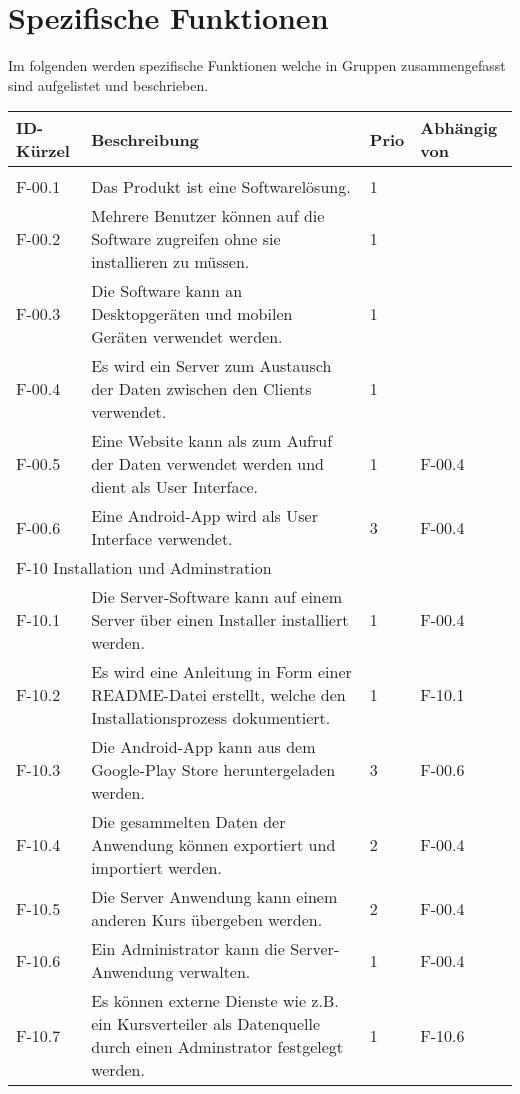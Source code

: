 \newpage
\section{Spezifische Funktionen}
Im folgenden werden spezifische Funktionen welche in Gruppen zusammengefasst sind aufgelistet und beschrieben.
\begin{tabularx}{\textwidth}{|l|X|l|l|}
    \toprule
    \textbf{ID-Kürzel} & \textbf{Beschreibung} & \textbf{Prio} & \textbf{Abhängig von} \\
    \midrule
    \endhead
    \hline
    \caption{Funktionen}
    \endfoot
    \multicolumn{4}{|l|}{F-00 Allgemein}\\
    \hline
    F-00.1 & Das Produkt ist eine Softwarelösung. & 1 & \\
    F-00.2 & Mehrere Benutzer können auf die Software zugreifen ohne sie installieren zu müssen. & 1 & \\
    F-00.3 & Die Software kann an Desktopgeräten und mobilen Geräten verwendet werden. & 1 & \\
    F-00.4 & Es wird ein Server zum Austausch der Daten zwischen den Clients verwendet. & 1 & \\
    F-00.5 & Eine Website kann als zum Aufruf der Daten verwendet werden und dient als User Interface. & 1 & F-00.4\\
    F-00.6 & Eine Android-App wird als User Interface verwendet. & 3 & F-00.4\\
    \hline
    \multicolumn{4}{|l|}{F-10 Installation und Adminstration}\\
    \hline
    F-10.1 & Die Server-Software kann auf einem Server über einen Installer installiert werden. & 1 & F-00.4 \\
    F-10.2 & Es wird eine Anleitung in Form einer README-Datei erstellt, welche den Installationsprozess dokumentiert. & 1 & F-10.1\\
    F-10.3 & Die Android-App kann aus dem Google-Play Store heruntergeladen werden. & 3 & F-00.6\\
    F-10.4 & Die gesammelten Daten der Anwendung können exportiert und importiert werden. & 2 & F-00.4\\
    F-10.5 & Die Server Anwendung kann einem anderen Kurs übergeben werden. & 2 & F-00.4\\
    F-10.6 & Ein Administrator kann die Server-Anwendung verwalten. & 1 & F-00.4\\
    F-10.7 & Es können externe Dienste wie z.B. ein Kursverteiler als Datenquelle durch einen Adminstrator festgelegt werden. & 1 & F-10.6\\

\end{tabularx}
